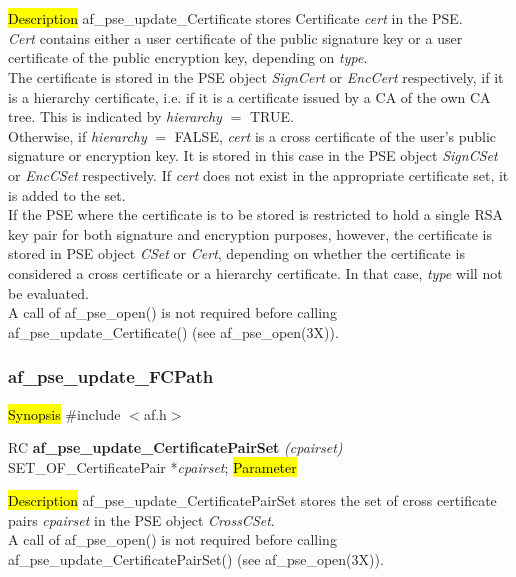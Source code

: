  \\
 \\
\hl{Description}
af\_pse\_update\_Certificate stores Certificate {\em cert} in the PSE.
\\ [1em]
{\em Cert} contains either a user certificate of the public signature key 
or a user certificate of the public encryption key, depending on {\em type}.
\\ [1em]
The certificate is stored in the PSE object {\em SignCert} or 
{\em EncCert} respectively, if it is a hierarchy certificate, i.e. if it is a certificate
issued by a CA of the own CA tree. This is indicated by {\em hierarchy} $=$ TRUE. 
\\ [1em]
Otherwise, if {\em hierarchy} $=$ FALSE, {\em cert} is a cross certificate of the user's
public signature or encryption key. It is stored in this case in the PSE object {\em SignCSet} or 
{\em EncCSet} respectively.
If {\em cert} does not exist in the appropriate certificate set,
it is added to the set.
\\ [1em]
If the PSE where the certificate is to be stored is restricted to hold a single RSA key pair
for both signature and encryption purposes, however, the certificate is stored in PSE object {\em CSet} or {\em Cert},
depending on whether the certificate is considered a cross certificate or a hierarchy certificate. In that case, {\em type} will not
be evaluated.
\\ [1em]
A call of af\_pse\_open() is not required before calling af\_pse\_update\_Certificate()
(see af\_pse\_open(3X)).

\subsubsection{af\_pse\_update\_FCPath}
\label{af_update_CertificatePairSet}
\hl{Synopsis}
\#include $<$af.h$>$

RC {\bf af\_pse\_update\_CertificatePairSet} {\em (cpairset)} \\
SET\_OF\_CertificatePair *{\em cpairset};
\hl{Parameter}

\hl{Description}
af\_pse\_update\_CertificatePairSet stores the set of cross certificate pairs {\em cpairset} 
in the PSE object {\em CrossCSet}.
\\ [1em]
A call of af\_pse\_open() is not required before calling af\_pse\_update\_CertificatePairSet()
(see af\_pse\_open(3X)).


